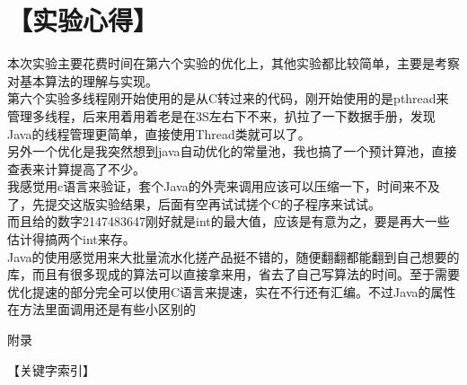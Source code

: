 \documentclass[12pt,a4paper]{article}
\begin{document}
\section*{【实验心得】}
    本次实验主要花费时间在第六个实验的优化上，其他实验都比较简单，主要是考察对基本算法的理解与实现。\\
    
    第六个实验多线程刚开始使用的是从C转过来的代码，刚开始使用的是pthread来管理多线程，后来用着用着老是在3S左右下不来，扒拉了一下数据手册，发现Java的线程管理更简单，直接使用Thread类就可以了。\\
    
    另外一个优化是我突然想到java自动优化的常量池，我也搞了一个预计算池，直接查表来计算提高了不少。\\
    
    我感觉用c语言来验证，套个Java的外壳来调用应该可以压缩一下，时间来不及了，先提交这版实验结果，后面有空再试试搓个C的子程序来试试。\\
    
    而且给的数字2147483647刚好就是int的最大值，应该是有意为之，要是再大一些估计得搞两个int来存。\\

    Java的使用感觉用来大批量流水化搓产品挺不错的，随便翻翻都能翻到自己想要的库，而且有很多现成的算法可以直接拿来用，省去了自己写算法的时间。至于需要优化提速的部分完全可以使用C语言来提速，实在不行还有汇编。不过Java的属性在方法里面调用还是有些小区别的\\
\newpage
\begin{center}
    {\heiti 附录}
\end{center}
{【关键字索引】}\\
\end{document}
